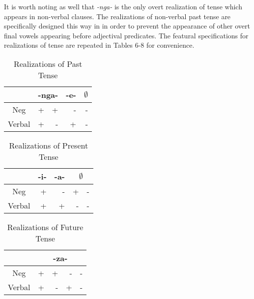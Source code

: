 \documentclass[output=paper]{langsci/langscibook}
\newcommand{\nga}[0]{\textit {-nga- }}
\begin{document}
It is worth noting as well that \nga is the only overt realization of tense which appears in non-verbal clauses. The realizations of non-verbal past tense are specifically designed this way in  in order to prevent the appearance of other overt final vowels appearing before adjectival predicates. The featural specifications for realizations of tense are repeated in Tables 6-8 for convenience. 


\begin{table}
\caption{Realizations of Past Tense} %
\centering %
\begin{tabular}{c| rr|r|r} %
\hline %
 &\multicolumn{2}{c}{-nga-}& \multicolumn{1}{|c}{-e-}& \multicolumn{1}{|c}{$\emptyset$} \\ [0.5ex] 
\hline %
Neg & + & + & - & -\\ %
Verbal & + & - & +& -\\[1ex] %
\hline %
\end{tabular} 
\label{tab:hresult} 
\end{table} 





\begin{table}
\caption{Realizations of Present Tense} %
\centering %
\begin{tabular}{c| r|r|rr} %
\hline %
 &\multicolumn{1}{c}{-i-}& \multicolumn{1}{|c|}{-a-}& \multicolumn{2}{|c}{$\emptyset$} \\ [0.5ex] 
\hline %
Neg & + & - & + & -\\ %
Verbal & + & + & -& -\\[1ex] %
\hline %
\end{tabular} 
\label{tab:hresult} 
\end{table} 



\begin{table}
\caption{Realizations of Future Tense} %
\centering %
\begin{tabular}{c| rrrr} %
\hline %
 &\multicolumn{4}{c}{-za-} \\ [0.5ex] 
\hline %
Neg & + & + & - & -\\ %
Verbal & + & - & +& -\\[1ex] %
\hline %
\end{tabular} 
\label{tab:hresult} 
\end{table} 
\end{document}
